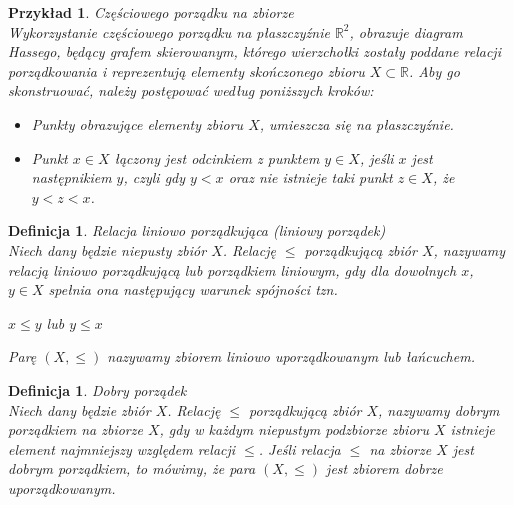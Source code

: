 \documentclass[12pt,a4paper]{report}
\newtheorem{definition}[theorem]{Definicja}
\newtheorem{example}{Przykład}
\begin{document}
\begin{example}{Częściowego porządku na zbiorze\\}
Wykorzystanie częściowego porządku na płaszczyźnie $\mathbb{R}^2$, obrazuje diagram Hassego, będący grafem skierowanym, którego wierzchołki zostały poddane relacji porządkowania i reprezentują elementy  skończonego zbioru $X \subset \mathbb{R}$. 
Aby go skonstruować, należy postępować według poniższych kroków:
\begin{itemize}
\item Punkty obrazujące elementy zbioru $X$, umieszcza się na płaszczyźnie.
\item Punkt $x\in X$ łączony jest odcinkiem z punktem $y \in X$, jeśli $x$ jest następnikiem $y$, czyli gdy $y <x$ oraz nie istnieje taki punkt $z \in X$, że $y<z<x$.
\end{itemize}
\end{example}


\begin{definition}{Relacja liniowo porządkująca (liniowy porządek) \cite[Rozdział 2]{blaszczyk2007}\\}\label{def-porzadek-liniowy}
Niech dany będzie niepusty zbiór $X$. Relację $\leq$ porządkującą zbiór $X$, nazywamy relacją liniowo porządkującą lub porządkiem liniowym, gdy dla dowolnych $x$, $y \in X$ spełnia ona następujący warunek spójności tzn.
\begin{center}
$x \leq y$ lub $y \leq x$
\end{center}
Parę $(X, \leq)$ nazywamy zbiorem liniowo uporządkowanym lub łańcuchem.\\
\end{definition}

\begin{definition}{Dobry porządek \cite[Rozdział 2]{blaszczyk2007}\\}
Niech dany będzie zbiór $X$. Relację $\leq$ porządkującą zbiór $X$, nazywamy dobrym porządkiem na zbiorze $X$, gdy w każdym niepustym podzbiorze zbioru $X$ istnieje element najmniejszy względem relacji $\leq$. Jeśli relacja $\leq$ na zbiorze $X$ jest dobrym porządkiem, to mówimy, że para $(X,\leq)$ jest zbiorem dobrze uporządkowanym.\\
\end{definition}
\end{document}
